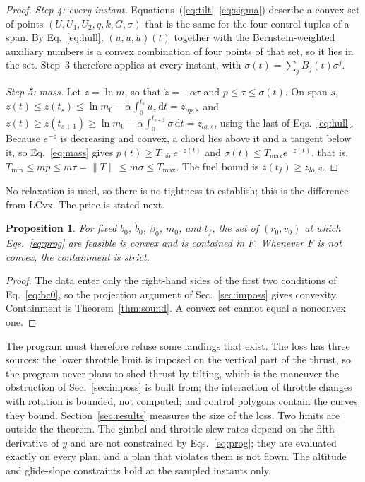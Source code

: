\documentclass[10pt,letterpaper]{article}
\theoremstyle{aiaa}
\newtheorem{proposition}{Proposition}
\newcommand{\norm}[1]{\lVert #1\rVert}
\newcommand{\Tmin}{T_{\min}}
\newcommand{\Tmax}{T_{\max}}
\begin{document}
\begin{proof}
\emph{Step 4: every instant.} Equations~(\ref{eq:tilt}--\ref{eq:sigma}) describe a convex set of points $(U,U_1,U_2,q,k,G,\sigma)$
that is the same for the four control tuples of a span. By Eq.~\eqref{eq:hull}, $(u,\dot u,\ddot u)(t)$ together with the
Bernstein-weighted auxiliary numbers is a convex combination of four points of that set, so it lies in the set. Step~3
therefore applies at every instant, with $\sigma(t)=\sum_jB_j(t)\sigma^j$.

\emph{Step 5: mass.} Let $z=\ln m$, so that $\dot z=-\alpha\tau$ and $p\le\tau\le\sigma(t)$. On span $s$,
$z(t)\le z(t_s)\le\ln m_0-\alpha\int_0^{t_s}u_z\,\mathrm dt=z_{up,s}$ and $z(t)\ge z(t_{s+1})\ge\ln m_0-\alpha\int_0^{t_{s+1}}\sigma\,\mathrm dt=z_{lo,s}$,
using the last of Eqs.~\eqref{eq:hull}. Because $e^{-z}$ is decreasing and convex, a chord lies above it and a tangent below it,
so Eq.~\eqref{eq:mass} gives $p(t)\ge\Tmin e^{-z(t)}$ and $\sigma(t)\le\Tmax e^{-z(t)}$, that is,
$\Tmin\le mp\le m\tau=\norm T\le m\sigma\le\Tmax$. The fuel bound is $z(t_f)\ge z_{lo,S}$.
\end{proof}

No relaxation is used, so there is no tightness to establish; this is the difference from LCvx. The price is stated next.

\begin{proposition}\label{prop:inc}
For fixed $b_0$, $\dot b_0$, $\beta_0$, $m_0$, and $t_f$, the set of $(r_0,v_0)$ at which Eqs.~\eqref{eq:prog} are feasible is
convex and is contained in $F$. Whenever $F$ is not convex, the containment is strict.
\end{proposition}
\begin{proof}
The data enter only the right-hand sides of the first two conditions of Eq.~\eqref{eq:bc0}, so the projection argument of
Sec.~\ref{sec:imposs} gives convexity. Containment is Theorem~\ref{thm:sound}. A convex set cannot equal a nonconvex one.
\end{proof}

The program must therefore refuse some landings that exist. The loss has three sources: the lower throttle limit is imposed on
the vertical part of the thrust, so the program never plans to shed thrust by tilting, which is the maneuver the obstruction of
Sec.~\ref{sec:imposs} is built from; the interaction of throttle changes with rotation is bounded, not computed; and control
polygons contain the curves they bound. Section~\ref{sec:results} measures the size of the loss. Two limits are outside the
theorem. The gimbal and throttle slew rates depend on the fifth derivative of $y$ and are not constrained by
Eqs.~\eqref{eq:prog}; they are evaluated exactly on every plan, and a plan that violates them is not flown. The altitude and
glide-slope constraints hold at the sampled instants only.
\end{document}
